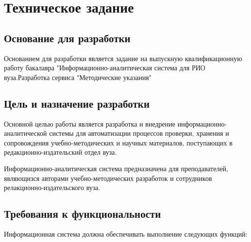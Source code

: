 \section{Техническое задание}

\subsection{Основание для разработки}

Основанием для разработки является задание на выпускную квалификационную работу бакалавра "Информационно-аналитическая система для РИО вуза.Разработка сервиса "Методические указания"

\subsection{Цель и назначение разработки}

Основной целью работы является разработка и внедрение информационно-аналитической системы для автоматизации процессов проверки, хранения и сопровождения учебно-методических и научных материалов, поступающих в редакционно-издательский отдел вуза.

Информационно-аналитическая система предназначена для преподавателей, являющизся авторами учебно-методических разработок и сотрудников релакционно-издательского вуза.

\subsection{Требования к функциональности}

Информационная система должна обеспечивать выполнение следующих функций:

